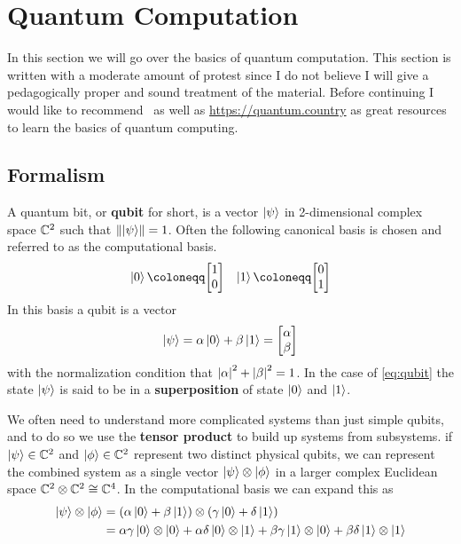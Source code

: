 
\section{Quantum Computation}

In this section we will go over the basics of quantum computation.
This section is written with a moderate amount of protest since I do not believe I will give a pedagogically proper and sound treatment of the material.
Before continuing I would like to recommend~\cite{nielsenchuang} as well as \url{https://quantum.country} as great resources to learn the basics of quantum computing.

\subsection{Formalism}

A quantum bit, or \textbf{qubit} for short, is a vector $\ket{\psi}$ in 2-dimensional complex space $\mathbb{C}^2$ such that $\norm{\ket{\psi}} = 1$.
Often the following canonical basis is chosen and referred to as the computational basis.
\begin{align}
    \ket{0} \defeq \mqty[1 \\ 0] & & \ket{1} \defeq \mqty[0 \\ 1]
\end{align}
In this basis a qubit is a vector
\begin{equation}\label{eq:qubit}
    \ket{\psi} = \alpha\ket{0} + \beta\ket{1} = \mqty[\alpha \\ \beta]
\end{equation}
with the normalization condition that $\abs{\alpha}^2 + \abs{\beta}^2 = 1$.
In the case of \cref{eq:qubit} the state $\ket{\psi}$ is said to be in a \textbf{superposition} of state $\ket{0}$ and $\ket{1}$.

We often need to understand more complicated systems than just simple qubits, and to do so we use the \textbf{tensor product} to build up systems from subsystems.
\Eg{} if $\ket{\psi}\in\mathbb{C}^2$ and $\ket{\phi}\in\mathbb{C}^2$ represent two distinct physical qubits, we can represent the combined system as a single vector $\ket{\psi}\otimes \ket{\phi}$ in a larger complex Euclidean space $\mathbb{C}^2\otimes \mathbb{C}^2\cong \mathbb{C}^4$.
In the computational basis we can expand this as
\begin{align}
    \ket{\psi}\otimes \ket{\phi} & = \qty(\alpha\ket{0} + \beta\ket{1})\otimes\qty(\gamma\ket{0} + \delta\ket{1})                                                                \\
                                 & = \alpha\gamma\ket{0}\otimes\ket{0} + \alpha\delta\ket{0}\otimes\ket{1} + \beta\gamma\ket{1}\otimes\ket{0} + \beta\delta\ket{1}\otimes\ket{1}
\end{align}


